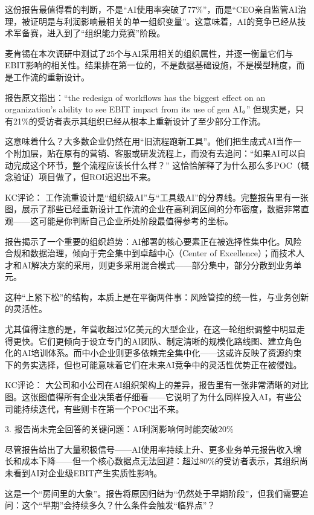 \documentclass[11pt]{ctexart}
\begin{document}
这份报告最值得看的判断，不是“AI使用率突破了77\%”，而是“CEO亲自监管AI治理，被证明是与利润影响最相关的单一组织变量”。这意味着，AI的竞争已经从技术军备赛，进入到了“组织能力竞赛”阶段。

麦肯锡在本次调研中测试了25个与AI采用相关的组织属性，并逐一衡量它们与EBIT影响的相关性。结果排在第一位的，不是数据基础设施，不是模型精度，而是工作流的重新设计。

报告原文指出：“the redesign of workflows has the biggest effect on an organization's ability to see EBIT impact from its use of gen AI。” 但现实是，只有21\%的受访者表示其组织已经从根本上重新设计了至少部分工作流。

这意味着什么？大多数企业仍然在用“旧流程跑新工具”。他们把生成式AI当作一个附加层，贴在原有的营销、客服或研发流程上，而没有去追问：“如果AI可以自动完成这个环节，整个流程应该长什么样？” 这恰恰解释了为什么那么多POC（概念验证）项目做了，但ROI迟迟出不来。

KC评论： 工作流重设计是“组织级AI”与“工具级AI”的分界线。完整报告里有一张图，展示了那些已经重新设计工作流的企业在高利润区间的分布密度，数据非常直观——这可能是你判断自己企业所处阶段最值得参考的坐标。

报告揭示了一个重要的组织趋势：AI部署的核心要素正在被选择性集中化。风险合规和数据治理，倾向于完全集中到卓越中心（Center of Excellence）；而技术人才和AI解决方案的采用，则更多采用混合模式——部分集中，部分分散到业务单元。

这种“上紧下松”的结构，本质上是在平衡两件事：风险管控的统一性，与业务创新的灵活性。

尤其值得注意的是，年营收超过5亿美元的大型企业，在这一轮组织调整中明显走得更快。它们更倾向于设立专门的AI团队、制定清晰的规模化路线图、建立角色化的AI培训体系。而中小企业则更多依赖完全集中化——这或许反映了资源约束下的务实选择，但也可能意味着它们在未来AI竞争中的灵活性优势正在被侵蚀。

KC评论： 大公司和小公司在AI组织架构上的差异，报告里有一张非常清晰的对比图。这张图值得所有企业决策者仔细看——它说明了为什么同样投入AI，有些公司能持续迭代，有些则卡在第一个POC出不来。

3. 报告尚未完全回答的关键问题：AI利润影响何时能突破20\%

尽管报告给出了大量积极信号——AI使用率持续上升、更多业务单元报告收入增长和成本下降——但一个核心数据点无法回避：超过80\%的受访者表示，其组织尚未看到AI对企业级EBIT产生实质性影响。

这是一个“房间里的大象”。报告将原因归结为“仍然处于早期阶段”，但我们需要追问：这个“早期”会持续多久？什么条件会触发“临界点”？
\end{document}
